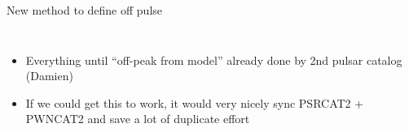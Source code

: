 \documentclass[12pt]{beamer}
\begin{document}
\begin{frame}{New method to define off pulse}
\begin{columns}



 \begin{itemize}
   \item Everything until ``off-peak from model'' already done by 2nd pulsar catalog (Damien) 
   \item If we could get this to work, it would very nicely sync PSRCAT2 + PWNCAT2 and
     save a lot of duplicate effort
 \end{itemize}
\end{columns}
\end{frame}
\end{document}
